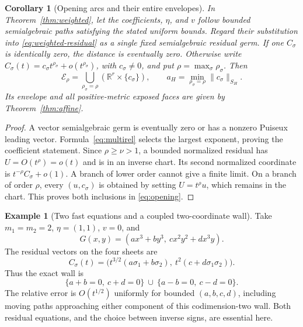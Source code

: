 \documentclass[11pt,reqno]{amsart}
\numberwithin{equation}{section}
\newtheorem{corollary}[theorem]{Corollary}
\theoremstyle{definition}
\newtheorem{example}[theorem]{Example}
\theoremstyle{remark}
\newcommand{\R}{\mathbb R}
\newcommand{\cE}{\mathcal E}
\begin{document}
\begin{corollary}[Opening arcs and their entire envelopes]\label{cor:opening}
In Theorem~\ref{thm:weighted}, let the coefficients, $\eta$, and $v$ follow bounded semialgebraic paths satisfying the stated uniform bounds. Regard their substitution into \eqref{eq:weighted-residual} as a single fixed semialgebraic residual germ. If one $C_\sigma$ is identically zero, the distance is eventually zero. Otherwise write
$C_\sigma(t)=c_\sigma t^{\rho_\sigma}+o(t^{\rho_\sigma})$, with $c_\sigma\ne0$, and put $\rho=\max_\sigma\rho_\sigma$. Then
\begin{equation}\label{eq:opening}
 \cE_\rho=\bigcup_{\rho_\sigma=\rho}(\R^r\times\{c_\sigma\}),
 \qquad
 a_H=\min_{\rho_\sigma=\rho}\|c_\sigma\|_{S_H}.
\end{equation}
Its envelope and all positive-metric exposed faces are given by Theorem~\ref{thm:affine}.
\end{corollary}
\begin{proof}
A vector semialgebraic germ is eventually zero or has a nonzero Puiseux leading vector. Formula~\eqref{eq:multirel} selects the largest exponent, proving the coefficient statement. Since $\rho\ge\nu>1$, a bounded normalized residual has $U=O(t^\rho)=o(t)$ and is in an inverse chart. Its second normalized coordinate is $t^{-\rho}C_\sigma+o(1)$. A branch of lower order cannot give a finite limit. On a branch of order $\rho$, every $(u,c_\sigma)$ is obtained by setting $U=t^\rho u$, which remains in the chart. This proves both inclusions in \eqref{eq:opening}.
\end{proof}

\begin{example}[Two fast equations and a coupled two-coordinate wall]\label{ex:coupled}
Take $m_1=m_2=2$, $\eta=(1,1)$, $v=0$, and
\[
 G(x,y)=(a x^3+b y^3,\ c x^2y^2+d x^3y).
\]
The residual vectors on the four sheets are
\[
 C_\sigma(t)=\bigl(t^{3/2}(a\sigma_1+b\sigma_2),\
                         t^2(c+d\sigma_1\sigma_2)\bigr).
\]
Thus the exact wall is
\[
 \{a+b=0,\ c+d=0\}\ \cup\ \{a-b=0,\ c-d=0\}.
\]
The relative error is $O(t^{1/2})$ uniformly for bounded $(a,b,c,d)$, including moving paths approaching either component of this codimension-two wall. Both residual equations, and the choice between inverse signs, are essential here.
\end{example}
\end{document}
